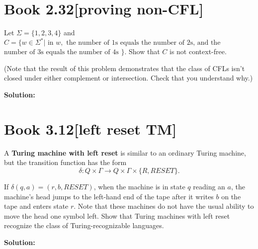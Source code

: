 \documentclass[11pt]{article}
\newenvironment{question}[2]
{\newpage\section{#1\texorpdfstring{\hfill}{horizontal spacing}{\rm\normalsize #2}}}{}
\newenvironment{solution}
{\textbf{Solution: }\color{blue}}
{\color{black}}
\begin{document}

\begin{question}{Book 2.32}{[proving non-CFL]}


Let \(\Sigma = \{1,2,3,4\}\) and \(C=\{w \in \Sigma^* | \text{ in } w, \text{ the number of 1s equals the number of 2s, and the }\) \(\text{number of 3s equals the number of 4s }\}\). Show that \(C\) is not context-free.

(Note that the result of this problem demonstrates that the class of CFLs isn’t closed under either complement or intersection. Check that you understand why.)

\begin{solution}



\end{solution}
\end{question}


\begin{question}{Book 3.12}{[left reset TM]}

A \textbf{Turing machine with left reset} is similar to an ordinary Turing machine, but the transition function has the form
\[\delta : Q \times \Gamma \rightarrow Q \times \Gamma \times \{R, RESET\}.\]

If \(\delta (q,a) = (r,b,RESET)\), when the machine is in state \(q\) reading an \(a\), the machine's head jumps to the left-hand end of the tape after it writes \(b\) on the tape and enters state \(r\). Note that these machines do not have the usual ability to move the head one symbol left. Show that Turing machines with left reset recognize the class of Turing-recognizable languages.

\begin{solution}



\end{solution}
\end{question}

\end{document}
